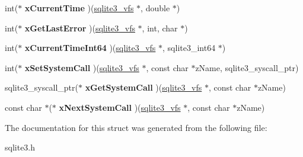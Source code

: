 \begin{DoxyCompactItemize}
\mbox{\label{structsqlite3__vfs_a925aa81bcf67f2daf50ad59de850ef41}} 
int($\ast$ {\bfseries x\+Current\+Time} )(\mbox{\hyperlink{structsqlite3__vfs}{sqlite3\+\_\+vfs}} $\ast$, double $\ast$)
\item 
\mbox{\label{structsqlite3__vfs_ae90895f142cc41801f515ae5e339a3d7}} 
int($\ast$ {\bfseries x\+Get\+Last\+Error} )(\mbox{\hyperlink{structsqlite3__vfs}{sqlite3\+\_\+vfs}} $\ast$, int, char $\ast$)
\item 
\mbox{\label{structsqlite3__vfs_a2a344dbc5e4625343d992546fbff5421}} 
int($\ast$ {\bfseries x\+Current\+Time\+Int64} )(\mbox{\hyperlink{structsqlite3__vfs}{sqlite3\+\_\+vfs}} $\ast$, sqlite3\+\_\+int64 $\ast$)
\item 
\mbox{\label{structsqlite3__vfs_a444cd80f79ea4994f72551bb9f403866}} 
int($\ast$ {\bfseries x\+Set\+System\+Call} )(\mbox{\hyperlink{structsqlite3__vfs}{sqlite3\+\_\+vfs}} $\ast$, const char $\ast$z\+Name, sqlite3\+\_\+syscall\+\_\+ptr)
\item 
\mbox{\label{structsqlite3__vfs_a1bf78a1603ab605cd92d146e3f810727}} 
sqlite3\+\_\+syscall\+\_\+ptr($\ast$ {\bfseries x\+Get\+System\+Call} )(\mbox{\hyperlink{structsqlite3__vfs}{sqlite3\+\_\+vfs}} $\ast$, const char $\ast$z\+Name)
\item 
\mbox{\label{structsqlite3__vfs_afbd158883d9bb7954fa7ecd595fe3c2b}} 
const char $\ast$($\ast$ {\bfseries x\+Next\+System\+Call} )(\mbox{\hyperlink{structsqlite3__vfs}{sqlite3\+\_\+vfs}} $\ast$, const char $\ast$z\+Name)
\end{DoxyCompactItemize}


The documentation for this struct was generated from the following file\+:\begin{DoxyCompactItemize}
\item 
sqlite3.\+h\end{DoxyCompactItemize}
